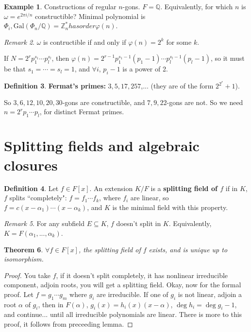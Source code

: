 \documentclass[9pt,reqno,twoside]{amsbook}
\theoremstyle{plain}
\newtheorem{theorem}{Theorem}[chapter]
\numberwithin{section}{chapter}
\numberwithin{equation}{chapter}
\theoremstyle{definition}
\newtheorem{Def}[theorem]{Definition}
\newtheorem{Ex}[theorem]{Example}
\theoremstyle{remark}
\newtheorem{rem}[theorem]{Remark}
\theoremstyle{plain}
\newcommand{\sub}{\subseteq}
\newcommand{\z}{\mathbb{Z}}
\newcommand{\Q}{\mathbb{Q}}
\newcommand{\gal}{\mathrm{Gal}}
\renewcommand{\phi}{\varphi}
\begin{document}
\begin{Ex}
Constructions of regular $n$-gons. $F = \Q$. Equivalently, for which $n$ is $\omega = e^{2\pi i/n}$ constructible? Minimal polynomial is $\Phi_i, \gal(\Phi_n/\Q) = \z_n^* has order \phi(n)$. 
\end{Ex}

\begin{rem}
$\omega$ is contructible if and only if $\phi(n)= 2^k$ for some $k$. 
\end{rem}

If $N = 2^rp_{1}^{s_1}\cdots p_{l}^{s_l}$, then $\phi(n) = 2^{r - 1}p_1^{s_1 - 1}(p_1 - 1)\cdots p_l^{s_l - 1}(p_l - 1)$, so it must be that $s_1 = \cdots = s_l = 1$, and $\forall i$, $p_i - 1$ is a power of 2. 

\begin{Def}
\textbf{Fermat's primes:} $3,5,17,257$,... (they are of the form $2^{2^r} + 1$). 
\end{Def}

So $3,6,12,10,20,30$-gons are constructible, and $7,9,22$-gons are not. So we need $n = 2^rp_1\cdots p_l$, for distinct Fermat primes. 











\section{Splitting fields and algebraic closures}


\begin{Def}
Let $f \in F[x]$. An extension $K/F$ is a \textbf{splitting field of $f$ }if in $K$, $f$ splits ``completely": $f = f_1\cdots f_k$, where $f_i$ are linear, so $f = c(x - \alpha_1)\cdots(x - \alpha_k)$, and $K$ is the minimal field with this property. 
\end{Def}

\begin{rem}
For any subfield $E\sub K$, $f$ doesn't split in $K$. Equivalently, $K = F(\alpha_1,...,\alpha_k)$. 
\end{rem}

\begin{theorem}
$\forall f \in F[x]$, the splitting field of $f$ exists, and is unique up to isomorphism. 
\end{theorem}

\begin{proof}
You take $f$, if it doesn't split completely, it has nonlinear irreducible component, adjoin roots, you will get a splitting field. Okay, now for the formal proof. Let $f = g_1\cdots g_m$ where $g_i$ are irreducible. If one of $g_i$ is not linear, adjoin a root $\alpha$ of $g_i$, then in $F(\alpha)$, $g_i(x) = h_i(x)(x - \alpha)$, $\deg h_i = \deg g_i - 1$, and continue... until all irreducible polynomials are linear. There is more to this proof, it follows from preceeding lemma. 
\end{proof}
\end{document}
